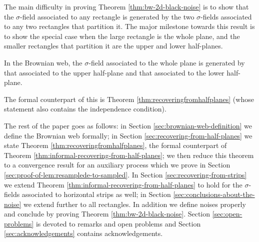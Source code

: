 {The main difficulty in proving
Theorem \ref{thm:bw-2d-black-noise} is to show that the $\sigma$-field
associated to any rectangle is generated by the two $\sigma$-fields
associated to any two rectangles that partition it.
The major milestone towards this result is to show the special case
when the large rectangle is the whole plane, and the smaller
rectangles that partition it are the upper and lower half-planes.

\begin{theorem}
\label{thm:informal-recovering-from-half-planes}
In the Brownian web, the $\sigma$-field associated to the whole plane
is generated by that associated to the upper half-plane and that
associated to the lower half-plane.
\end{theorem}

The formal counterpart of this is
Theorem \ref{thm:recoveringfromhalfplanes} (whose statement also
contains the independence condition).

The rest of the paper goes as follows: in Section \ref{sec:brownian-web-definition} we define the
Brownian web formally; in Section \ref{sec:recovering-from-half-planes} we state Theorem \ref{thm:recoveringfromhalfplanes}, the formal
counterpart of Theorem \ref{thm:informal-recovering-from-half-planes}; we then reduce this theorem to a
convergence result for an auxiliary process which we prove in Section
\ref{sec:proof-of-lem:resamplede-to-sampled}.  In Section \ref{sec:recovering-from-strips} we extend Theorem \ref{thm:informal-recovering-from-half-planes} to hold for the
$\sigma$-fields associated to horizontal strips as well; in Section \ref{sec:conclusions-about-the-noise}
we extend further to all rectangles.  In addition we define noises
properly and conclude by proving Theorem \ref{thm:bw-2d-black-noise}.  Section \ref{sec:open-problems} is devoted to
remarks and open problems and Section \ref{sec:acknowledgements} contains
acknowledgements.

}
